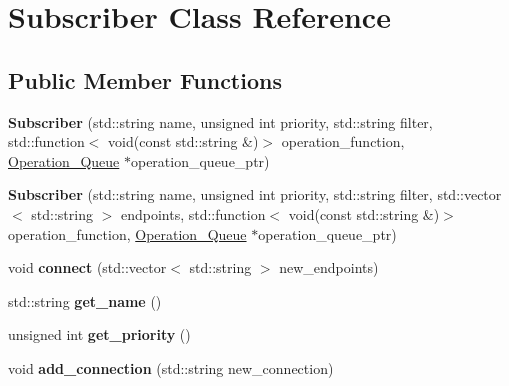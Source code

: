 \hypertarget{classSubscriber}{}\section{Subscriber Class Reference}
\label{classSubscriber}
\subsection*{Public Member Functions}
\begin{DoxyCompactItemize}
\item 
{\bfseries Subscriber} (std\+::string name, unsigned int priority, std\+::string filter, std\+::function$<$ void(const std\+::string \&)$>$ operation\+\_\+function, \hyperlink{classOperation__Queue}{Operation\+\_\+\+Queue} $\ast$operation\+\_\+queue\+\_\+ptr)\hypertarget{classSubscriber_a21da7eaa648e01d062e73318fb7efa1c}{}\label{classSubscriber_a21da7eaa648e01d062e73318fb7efa1c}

\item 
{\bfseries Subscriber} (std\+::string name, unsigned int priority, std\+::string filter, std\+::vector$<$ std\+::string $>$ endpoints, std\+::function$<$ void(const std\+::string \&)$>$ operation\+\_\+function, \hyperlink{classOperation__Queue}{Operation\+\_\+\+Queue} $\ast$operation\+\_\+queue\+\_\+ptr)\hypertarget{classSubscriber_aa24c82c7bfe2754c4220f38e93fd820f}{}\label{classSubscriber_aa24c82c7bfe2754c4220f38e93fd820f}

\item 
void {\bfseries connect} (std\+::vector$<$ std\+::string $>$ new\+\_\+endpoints)\hypertarget{classSubscriber_ac5f15d5b5b17723a806fc0c3d27cc0d9}{}\label{classSubscriber_ac5f15d5b5b17723a806fc0c3d27cc0d9}

\item 
std\+::string {\bfseries get\+\_\+name} ()\hypertarget{classSubscriber_aaaca14d4fe5aab6ea77cb8e1d3514fbe}{}\label{classSubscriber_aaaca14d4fe5aab6ea77cb8e1d3514fbe}

\item 
unsigned int {\bfseries get\+\_\+priority} ()\hypertarget{classSubscriber_aeb42dbfd280972f49cc7878b1508f1d5}{}\label{classSubscriber_aeb42dbfd280972f49cc7878b1508f1d5}

\item 
void {\bfseries add\+\_\+connection} (std\+::string new\+\_\+connection)\hypertarget{classSubscriber_ae9a7c65672dd0a8ae94af8ade499e8c1}{}\label{classSubscriber_ae9a7c65672dd0a8ae94af8ade499e8c1}


\end{DoxyCompactItemize}
